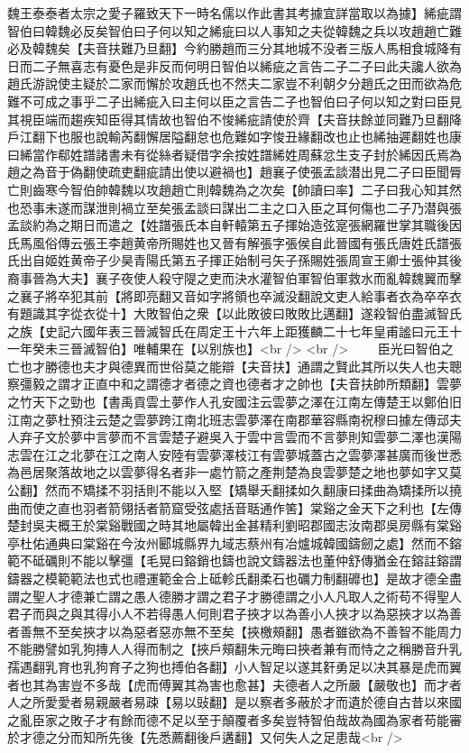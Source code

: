 魏王泰泰者太宗之愛子羅致天下一時名儒以作此書其考據宜詳當取以為據】絺疵謂智伯曰韓魏必反矣智伯曰子何以知之絺疵曰以人事知之夫從韓魏之兵以攻趙趙亡難必及韓魏矣【夫音扶難乃旦翻】今約勝趙而三分其地城不没者三版人馬相食城降有日而二子無喜志有憂色是非反而何明日智伯以絺疵之言告二子二子曰此夫讒人欲為趙氏游說使主疑於二家而懈於攻趙氏也不然夫二家豈不利朝夕分趙氏之田而欲為危難不可成之事乎二子出絺疵入曰主何以臣之言告二子也智伯曰子何以知之對曰臣見其視臣端而趨疾知臣得其情故也智伯不悛絺疵請使於齊【夫音扶餘並同難乃旦翻降戶江翻下也服也說輸芮翻懈居隘翻怠也危難如字悛丑緣翻改也止也絺抽遲翻姓也康曰絺當作郗姓譜諸書未有從絲者疑借字余按姓譜絺姓周蘇忿生支子封於絺因氏焉為趙之為音于偽翻使疏吏翻疵請出使以避禍也】趙襄子使張孟談潜出見二子曰臣聞脣亡則齒寒今智伯帥韓魏以攻趙趙亡則韓魏為之次矣【帥讀曰率】二子曰我心知其然也恐事未遂而謀泄則禍立至矣張孟談曰謀出二主之口入臣之耳何傷也二子乃潜與張孟談約為之期日而遣之【姓譜張氏本自軒轅第五子揮始造弦寔張網羅世掌其職後因氏馬風俗傳云張王李趙黄帝所賜姓也又晉有解張字張侯自此晉國有張氏唐姓氏譜張氏出自姬姓黄帝子少昊青陽氏第五子揮正始制弓矢子孫賜姓張周宣王卿士張仲其後裔事晉為大夫】襄子夜使人殺守隄之吏而決水灌智伯軍智伯軍救水而亂韓魏翼而擊之襄子將卒犯其前【將即亮翻又音如字將領也卒滅没翻說文吏人給事者衣為卒卒衣有題識其字從衣從十】大敗智伯之衆【以此敗彼曰敗敗比邁翻】遂殺智伯盡滅智氏之族【史記六國年表三晉滅智氏在周定王十六年上距獲麟二十七年皇甫謐曰元王十一年癸未三晉滅智伯】唯輔果在【以别族也】<br />
<br />
　　臣光曰智伯之亡也才勝德也夫才與德異而世俗莫之能辯【夫音扶】通謂之賢此其所以失人也夫聰察彊毅之謂才正直中和之謂德才者德之資也德者才之帥也【夫音扶帥所類翻】雲夢之竹天下之勁也【書禹貢雲土夢作人孔安國注云雲夢之澤在江南左傳楚王以鄭伯旧江南之夢杜預注云楚之雲夢跨江南北班志雲夢澤在南郡華容縣南祝穆曰據左傳䢵夫人弃子文於夢中言夢而不言雲楚子避吳入于雲中言雲而不言夢則知雲夢二澤也漢陽志雲在江之北夢在江之南人安陸有雲夢澤枝江有雲夢城蓋古之雲夢澤甚廣而後世悉為邑居聚落故地之以雲夢得名者非一處竹箭之產荆楚為良雲夢楚之地也夢如字又莫公翻】然而不矯揉不羽括則不能以入堅【矯舉夭翻揉如久翻康曰揉曲為矯揉所以撓曲而使之直也羽者箭翎括者箭窟受弦處括音聒通作筈】棠谿之金天下之利也【左傳楚封吳夫概王於棠谿戰國之時其地屬韓出金甚精利劉昭郡國志汝南郡吳房縣有棠谿亭杜佑通典曰棠谿在今汝州郾城縣界九域志蔡州有冶爐城韓國鑄劒之處】然而不鎔範不砥礪則不能以擊彊【毛晃曰鎔銷也鑄也說文鑄器法也董仲舒傳猶金在鎔註鎔謂鑄器之模範範法也式也禮運範金合上砥軫氏翻柔石也礪力制翻䃺也】是故才德全盡謂之聖人才德兼亡謂之愚人德勝才謂之君子才勝德謂之小人凡取人之術苟不得聖人君子而與之與其得小人不若得愚人何則君子挾才以為善小人挾才以為惡挾才以為善者善無不至矣挾才以為惡者惡亦無不至矣【挾檄頰翻】愚者雖欲為不善智不能周力不能勝譬如乳狗摶人人得而制之【挾戶頰翻朱元晦曰挾者兼有而恃之之稱勝音升乳孺遇翻乳育也乳狗育子之狗也搏伯各翻】小人智足以遂其姧勇足以决其暴是虎而翼者也其為害豈不多哉【虎而傅翼其為害也愈甚】夫德者人之所嚴【嚴敬也】而才者人之所愛愛者易親嚴者易疎【易以䜴翻】是以察者多蔽於才而遺於德自古昔以來國之亂臣家之敗子才有餘而德不足以至于顛覆者多矣豈特智伯哉故為國為家者苟能審於才德之分而知所先後【先悉薦翻後戶遘翻】又何失人之足患哉<br />
